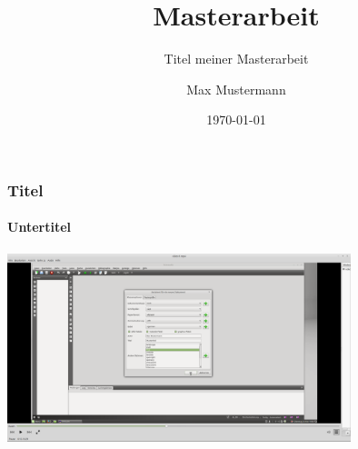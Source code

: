 \documentclass{beamer}
\title{Masterarbeit}
\subtitle{Titel meiner Masterarbeit}
\author{Max Mustermann}
\date{\today}
\institute{Hochschule Musterstadt}
\begin{document}
\begin{frame}
\frametitle{Titel}
\framesubtitle{Untertitel}
\centering
\href{run:./video1.mp4}{\includegraphics[width=10cm]{video1-bild.png}}

\end{frame}
\end{document}
